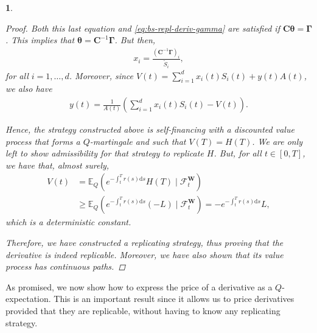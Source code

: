 \documentclass[english]{article}
\numberwithin{equation}{section}
\numberwithin{figure}{section}
\theoremstyle{bolddescit}
\newtheorem{theorem}{\protect\theoremname}[section]
\theoremstyle{definition}
\theoremstyle{definition}
\theoremstyle{plain}
\theoremstyle{plain}
\theoremstyle{bolddesc}
\theoremstyle{plain}
\theoremstyle{remark}
\providecommand{\theoremname}{Theorem}
\begin{document}
\begin{theorem}
\begin{proof}
    Both this last equation and \eqref{eq:bs-repl-deriv-gamma} are satisfied if $\mathbf{C} \mathbf{\theta} = \mathbf{\Gamma}$. This implies that $\mathbf{\theta} = \mathbf{C}^{-1} \mathbf{\Gamma}$. But then,
    \begin{align*}
      x_i = \frac{(\mathbf{C}^{-1} \mathbf{\Gamma})_i}{\widetilde{S}_i},
    \end{align*}
    for all $i=1,\ldots,d$. Moreover, since $V(t) = \sum_{i=1}^d x_i(t) S_i(t) + y(t) A(t)$, we also have
    \begin{align*}
      y(t) = \frac{1}{A(t)} \left(\sum_{i=1}^d x_i(t) S_i(t) - V(t)\right).
    \end{align*}

    Hence, the strategy constructed above is self-financing with a discounted value process that forms a $Q$-martingale and such that $V(T) = H(T)$. We are only left to show admissibility for that strategy to replicate $H$. But, for all $t \in [0,T]$, we have that, almost surely,
    \begin{align*}
      V(t) &= \mathbb{E}_Q\left(e^{-\int_t^T r(s) \mathrm{d}s} H(T) \mid \mathcal{F}^\mathbf{W}_t\right)\\
      &\ge \mathbb{E}_Q\left(e^{-\int_t^T r(s) \mathrm{d}s} (-L) \mid \mathcal{F}^\mathbf{W}_t\right)
      = - e^{-\int_t^T r(s) \mathrm{d}s} L,
    \end{align*}
    which is a deterministic constant.

    Therefore, we have constructed a replicating strategy, thus proving that the derivative is indeed replicable. Moreover, we have also shown that its value process has continuous paths.
  \end{proof}
\end{theorem}

As promised, we now show how to express the price of a derivative as a $Q$-expectation. This is an important result since it allows us to price derivatives provided that they are replicable, without having to know any replicating strategy.
\end{document}
